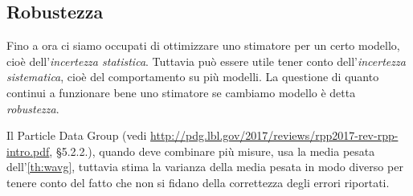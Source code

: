 
\subsection{Robustezza}

Fino a ora ci siamo occupati di ottimizzare uno stimatore per un certo modello,
cioè dell'\emph{incertezza statistica}.
Tuttavia può essere utile tener conto dell'\emph{incertezza sistematica},
cioè del comportamento su più modelli.
La questione di quanto continui a funzionare bene uno stimatore se cambiamo modello è detta \emph{robustezza}.

\begin{example}
    Il Particle Data Group (vedi
    \url{http://pdg.lbl.gov/2017/reviews/rpp2017-rev-rpp-intro.pdf}, §5.2.2.),
    quando deve combinare più misure, usa la media pesata
    dell'\autoref{th:wavg}, tuttavia stima la varianza della media pesata in
    modo diverso per tenere conto del fatto che non si fidano della
    correttezza degli errori riportati.
\end{example}


